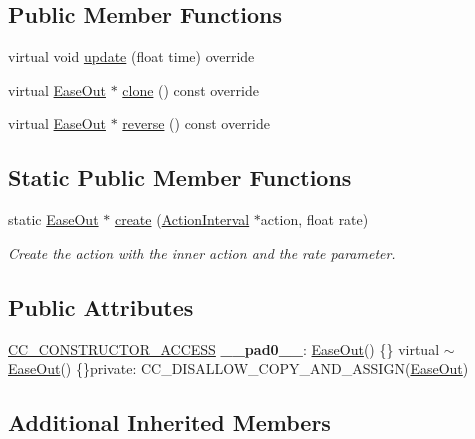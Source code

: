 \subsection*{Public Member Functions}
\begin{DoxyCompactItemize}
\item 
virtual void \hyperlink{classEaseOut_a1fe43c782ff47f143ab5db00f7c76aea}{update} (float time) override
\item 
virtual \hyperlink{classEaseOut}{Ease\+Out} $\ast$ \hyperlink{classEaseOut_aaa3ddcdc100a3378279054d596e87178}{clone} () const override
\item 
virtual \hyperlink{classEaseOut}{Ease\+Out} $\ast$ \hyperlink{classEaseOut_a6ad7b6fdd15cf8c5f1c3ad325c384f51}{reverse} () const override
\end{DoxyCompactItemize}
\subsection*{Static Public Member Functions}
\begin{DoxyCompactItemize}
\item 
static \hyperlink{classEaseOut}{Ease\+Out} $\ast$ \hyperlink{classEaseOut_a8c52d1cc96774a86e93fc20b3b311cf5}{create} (\hyperlink{classActionInterval}{Action\+Interval} $\ast$action, float rate)
\begin{DoxyCompactList}\small\item\em Create the action with the inner action and the rate parameter. \end{DoxyCompactList}\end{DoxyCompactItemize}
\subsection*{Public Attributes}
\begin{DoxyCompactItemize}
\item 
\mbox{\label{classEaseOut_a32cfe85a1aed441e0f195d44bf5854b5}} 
\hyperlink{_2cocos2d_2cocos_2base_2ccConfig_8h_a25ef1314f97c35a2ed3d029b0ead6da0}{C\+C\+\_\+\+C\+O\+N\+S\+T\+R\+U\+C\+T\+O\+R\+\_\+\+A\+C\+C\+E\+SS} {\bfseries \+\_\+\+\_\+pad0\+\_\+\+\_\+}\+: \hyperlink{classEaseOut}{Ease\+Out}() \{\} virtual $\sim$\hyperlink{classEaseOut}{Ease\+Out}() \{\}private\+: C\+C\+\_\+\+D\+I\+S\+A\+L\+L\+O\+W\+\_\+\+C\+O\+P\+Y\+\_\+\+A\+N\+D\+\_\+\+A\+S\+S\+I\+GN(\hyperlink{classEaseOut}{Ease\+Out})
\end{DoxyCompactItemize}
\subsection*{Additional Inherited Members}


